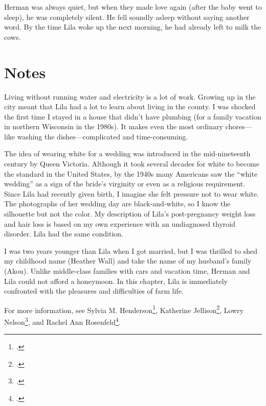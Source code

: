 \documentclass[
  letterpaper,
]{book}
\begin{document}
Herman was always quiet, but when they made love again (after the baby
went to sleep), he was completely silent. He fell soundly asleep without
saying another word. By the time Lila woke up the next morning, he had
already left to milk the cows.

\section{Notes}\label{notes-37}

Living without running water and electricity is a lot of work. Growing
up in the city meant that Lila had a lot to learn about living in the
county. I was shocked the first time I stayed in a house that didn't
have plumbing (for a family vacation in northern Wisconsin in the
1980s). It makes even the most ordinary chores---like washing the
dishes---complicated and time-consuming.

The idea of wearing white for a wedding was introduced in the
mid-nineteenth century by Queen Victoria. Although it took several
decades for white to become the standard in the United States, by the
1940s many Americans saw the ``white wedding'' as a sign of the bride's
virginity or even as a religious requirement. Since Lila had recently
given birth, I imagine she felt pressure not to wear white. The
photographs of her wedding day are black-and-white, so I know the
silhouette but not the color. My description of Lila's post-pregnancy
weight loss and hair loss is based on my own experience with an
undiagnosed thyroid disorder. Lila had the same condition.

I was two years younger than Lila when I got married, but I was thrilled
to shed my childhood name (Heather Wall) and take the name of my
husband's family (Akou). Unlike middle-class families with cars and
vacation time, Herman and Lila could not afford a honeymoon. In this
chapter, Lila is immediately confronted with the pleasures and
difficulties of farm life.

For more information, see Sylvia M. Henderson\footnote{.}, Katherine
Jellison\footnote{.}, Lowry Nelson\footnote{.}, and Rachel
Ann Rosenfeld\footnote{.}.
\end{document}
